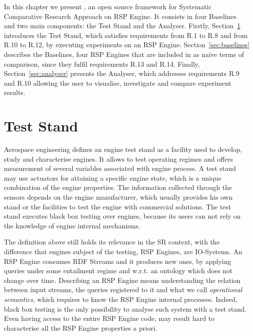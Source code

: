 In this chapter  we present \namens,  an open source framework for Systematic Comparative Research Approach on RSP Engine.
It consists in four Baselines and two main components: the Test Stand and the Analyser. Firstly, Section~\ref{sec:teststand} introduces the Test Stand, which satisfies requirements from R.1 to R.8 and from R.10 to R.12, by executing experiments on an RSP Engine. Section~\ref{sec:baselines} describes the Baselines, four RSP Engines that are included in \name as naive terms of comparison, since they fulfil requirements R.13 and R.14. Finally, Section~\ref{sec:analyser} presents the Analyser, which addresses requirements R.9 and R.10  allowing the user to visualise, investigate and compare experiment results. %

\section{Test Stand}\label{sec:teststand}

Aerospace engineering defines an engine test stand as a facility used to develop, study and characterise engines. It allows to test operating regimes and offers measurement of several variables associated with engine process. A test stand may use actuators for attaining a specific engine state, which is a unique combination of the engine properties. The information collected through the sensors depends on the engine manufacturer, which usually provides his own stand or the facilities to test the engine with commercial solutions. The test stand executes black box testing over engines, because its users can not rely on the knowledge of engine internal mechanisms.

The definition above still holds its relevance in the SR context, with the difference that engines subject of the testing, RSP Engines, are IO-Systems. An RSP Engine consumes  RDF Streams and it produces new ones, by applying queries under some entailment regime and w.r.t. an ontology which does not change over time. Describing an RSP Engine means understanding the relation between input streams, the queries registered to it and what we call \textit{operational semantics}, which requires to know the RSP Engine internal processes. Indeed, black box testing is the only possibility to analyse such system with a test stand. Even having access to the entire RSP Engine code, may result hard to characterise all the RSP Engine properties a priori. 

